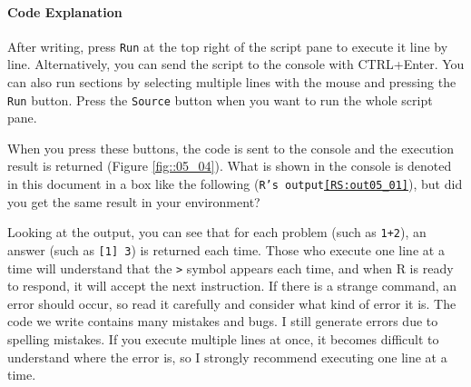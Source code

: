 \documentclass{ltjsbook}
\begin{document}
\paragraph{Code Explanation}


After writing, press \texttt{Run} at the top right of the script pane to execute it line by line. Alternatively, you can send the script to the console with CTRL+Enter. You can also run sections by selecting multiple lines with the mouse and pressing the \texttt{Run} button. Press the \texttt{Source} button when you want to run the whole script pane.


When you press these buttons, the code is sent to the console and the execution result is returned (Figure \ref{fig::05_04}). What is shown in the console is denoted in this document in a box like the following (\texttt{R's output\ref{RS:out05_01}}), but did you get the same result in your environment?


Looking at the output, you can see that for each problem (such as \verb|1+2|), an answer (such as \verb|[1] 3|) is returned each time. Those who execute one line at a time will understand that the \verb|>| symbol appears each time, and when R is ready to respond, it will accept the next instruction. If there is a strange command, an error should occur, so read it carefully and consider what kind of error it is. The code we write contains many mistakes and bugs. I still generate errors due to spelling mistakes. If you execute multiple lines at once, it becomes difficult to understand where the error is, so I strongly recommend executing one line at a time.
\end{document}

